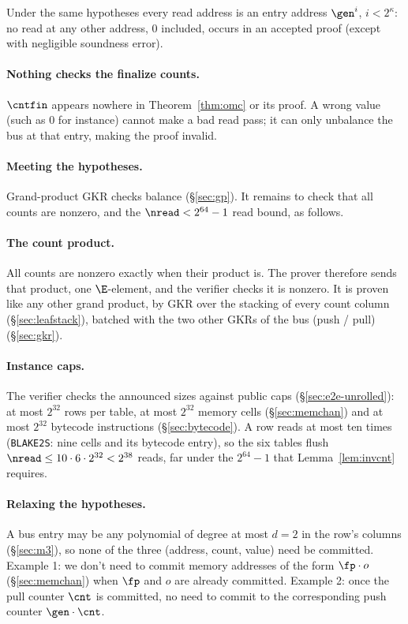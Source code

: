 \begin{corollary}\label{cor:addrrange}
Under the same hypotheses every read address is an entry address $\gen^{i}$, $i<2^{\kappa}$: no read at any other address, $0$ included, occurs in an accepted proof (except with negligible soundness error).
\end{corollary}

\paragraph{Nothing checks the finalize counts.} $\cntfin$ appears nowhere in Theorem~\ref{thm:omc} or its proof. A wrong value (such as $0$ for instance) cannot make a bad read pass; it can only unbalance the bus at that entry, making the proof invalid.

\paragraph{Meeting the hypotheses.} Grand-product GKR checks balance (\S\ref{sec:gp}). It remains to check that all counts are nonzero, and the $\nread<2^{64}-1$ read bound, as follows.

\paragraph{The count product.} All counts are nonzero exactly when their product is. The prover therefore sends that product, one $\E$-element, and the verifier checks it is nonzero. It is proven like any other grand product, by GKR over the stacking of every count column (\S\ref{sec:leafstack}), batched with the two other GKRs of the bus (push / pull) (\S\ref{sec:gkr}).

\paragraph{Instance caps.} The verifier checks the announced sizes against public caps (\S\ref{sec:e2e-unrolled}): at most $2^{32}$ rows per table, at most $2^{32}$ memory cells (\S\ref{sec:memchan}) and at most $2^{32}$ bytecode instructions (\S\ref{sec:bytecode}). A row reads at most ten times (\texttt{BLAKE2S}: nine cells and its bytecode entry), so the six tables flush $\nread\le10\cdot6\cdot2^{32}<2^{38}$ reads, far under the $2^{64}-1$ that Lemma~\ref{lem:invcnt} requires.

\paragraph{Relaxing the hypotheses.} A bus entry may be any polynomial of degree at most $d = 2$ in the row's columns (\S\ref{sec:m3}), so none of the three (address, count, value) need be committed. Example 1: we don't need to commit memory addresses of the form $\fp\cdot o$ (\S\ref{sec:memchan}) when $\fp$ and $o$ are already committed. Example 2: once the pull counter $\cnt$ is committed, no need to commit to the corresponding push counter $\gen\cdot\cnt$.

